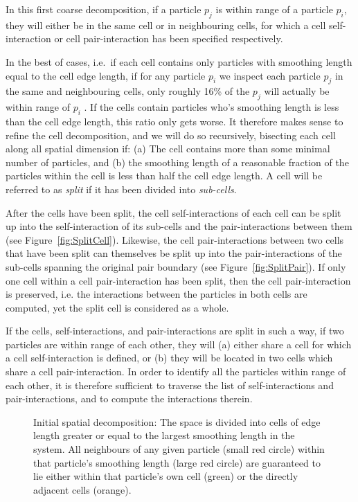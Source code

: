 \documentclass[final]{siamltex}
\newcommand{\fig}[1]
    {Figure~\ref{fig:#1}}
\begin{document}
In this first coarse decomposition, if a particle $p_j$
is within range of a particle $p_i$, they will either be
in the same cell or in neighbouring cells, for which a
cell self-interaction or cell pair-interaction has been
specified respectively.

In the best of cases, i.e.~if each cell contains
only particles with smoothing length equal to the cell
edge length, if for any particle $p_i$ we inspect each
particle $p_j$ in the same
and neighbouring cells, only roughly 16\% of the $p_j$
will actually be within range of $p_i$ \cite{ref:Gonnet2007}.
If the cells contain particles who's smoothing length
is less than the cell edge length, this ratio only
gets worse.
It therefore makes sense to refine the cell decomposition,
and we will do so recursively, bisecting each cell along
all spatial dimension if: (a) The cell contains more than
some minimal number of particles, and (b) the smoothing
length of a reasonable fraction of the particles within
the cell is less than half the cell edge length.
A cell will be referred to as {\em split} if it
has been divided into {\em sub-cells}.

After the cells have been split, the cell self-interactions
of each cell can be split up into the self-interaction
of its sub-cells and the pair-interactions between
them (see \fig{SplitCell}).
Likewise, the cell pair-interactions between two cells
that have been split can themselves be split up into
the pair-interactions of the sub-cells spanning the
original pair boundary (see \fig{SplitPair}).
If only one cell within a cell pair-interaction has been
split, then the cell pair-interaction is preserved, i.e. the
interactions between the particles in both cells are computed,
yet the split cell is considered as a whole.

If the cells, self-interactions, and pair-interactions are split
in such a way, if two particles are within range of each other,
they will (a) either share a cell for which a cell self-interaction
is defined, or (b) they will be located in two cells which share
a cell pair-interaction.
In order to identify all the particles within range of each other,
it is therefore sufficient to traverse the list of
self-interactions and pair-interactions, and to compute the
interactions therein.


\begin{figure}
    \centerline{}
    
    \caption{Initial spatial decomposition: The space is divided into cells of
        edge length greater or equal to the largest smoothing length in the
        system. All neighbours of any given particle (small red circle) within
        that particle's smoothing length (large red circle) are guaranteed to lie
        either within that particle's own cell (green) or the directly
        adjacent cells (orange).}
    \label{fig:InitialDecomp}
\end{figure}
\end{document}
